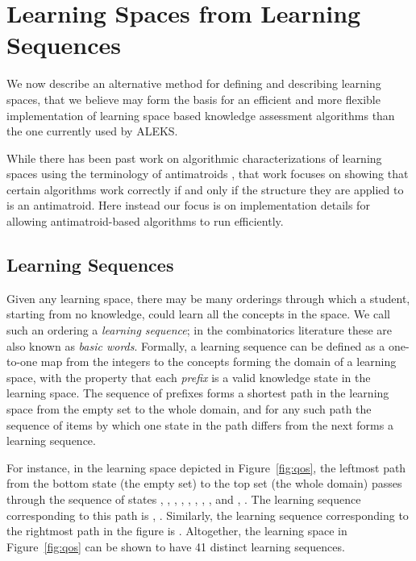 \documentclass[11pt]{llncs}
\begin{document}
{\section{Learning Spaces from Learning Sequences}

We now describe an alternative method for defining and describing learning spaces, that we believe may form the basis for an efficient and more flexible implementation of learning space based knowledge assessment algorithms than the one currently used by ALEKS.

While there has been past work on algorithmic characterizations of learning spaces using the terminology of antimatroids \citep{BoyFai-DAM-90,KemLev-arXiv-03}, that work focuses on showing that certain algorithms work correctly if and only if the structure they are applied to is an antimatroid. Here instead our focus is on implementation details for allowing antimatroid-based algorithms to run efficiently.

\subsection{Learning Sequences}

Given any learning space, there may be many orderings through which a student, starting from no knowledge, could learn all the concepts in the space. We call such an ordering a \emph{learning sequence}; in the combinatorics literature these are also known as \emph{basic words}.  Formally, a learning sequence  can be defined as a one-to-one map from the integers  to the  concepts forming the domain of a learning space, with the property that each \emph{prefix}  is a valid knowledge state in the learning space.  The sequence of prefixes  forms a shortest path in the learning space from the empty set to the whole domain, and for any such path the sequence of items by which one state in the path differs from the next forms a learning sequence.

For instance, in the learning space depicted in Figure~\ref{fig:qos}, the leftmost path from the bottom state (the empty set) to the top set (the whole domain) passes through the sequence of states
, , , , , , , , and , . The learning sequence corresponding to this path is , .
Similarly, the learning sequence corresponding to the rightmost path in the figure is .
Altogether, the learning space in Figure~\ref{fig:qos} can be shown to have 41 distinct learning sequences.

}
\end{document}
